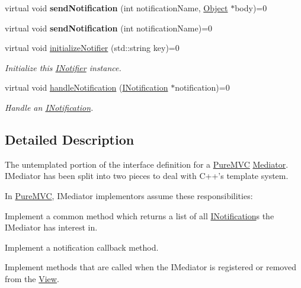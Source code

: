 \begin{DoxyCompactItemize}
\item 
\hypertarget{class_pure_m_v_c_1_1_i_notifier_a4d6bac0719be96948e4f7417489daeaa}{
virtual void {\bfseries sendNotification} (int notificationName, \hyperlink{class_pure_m_v_c_1_1_object}{Object} $\ast$body)=0}
\label{class_pure_m_v_c_1_1_i_notifier_a4d6bac0719be96948e4f7417489daeaa}

\item 
\hypertarget{class_pure_m_v_c_1_1_i_notifier_aca921608a2ced017a8face049fc7c6af}{
virtual void {\bfseries sendNotification} (int notificationName)=0}
\label{class_pure_m_v_c_1_1_i_notifier_aca921608a2ced017a8face049fc7c6af}

\item 
virtual void \hyperlink{class_pure_m_v_c_1_1_i_notifier_a28d7dbbe0726d4d52080546c5d79b232}{initializeNotifier} (std::string key)=0
\begin{DoxyCompactList}\small\item\em Initialize this \hyperlink{class_pure_m_v_c_1_1_i_notifier}{INotifier} instance. \item\end{DoxyCompactList}\item 
virtual void \hyperlink{class_pure_m_v_c_1_1_i_notification_handler_af31efbe0929caff0ac371bf45d3e9c50}{handleNotification} (\hyperlink{class_pure_m_v_c_1_1_i_notification}{INotification} $\ast$notification)=0
\begin{DoxyCompactList}\small\item\em Handle an {\ttfamily \hyperlink{class_pure_m_v_c_1_1_i_notification}{INotification}}. \item\end{DoxyCompactList}\end{DoxyCompactItemize}


\subsection{Detailed Description}
The untemplated portion of the interface definition for a \hyperlink{namespace_pure_m_v_c}{PureMVC} \hyperlink{class_pure_m_v_c_1_1_mediator}{Mediator}. IMediator has been split into two pieces to deal with C++'s template system. 

In \hyperlink{namespace_pure_m_v_c}{PureMVC}, {\ttfamily IMediator} implementors assume these responsibilities: 
\begin{DoxyItemize}
\item Implement a common method which returns a list of all {\ttfamily \hyperlink{class_pure_m_v_c_1_1_i_notification}{INotification}}s the {\ttfamily IMediator} has interest in. 
\item Implement a notification callback method. 
\item Implement methods that are called when the IMediator is registered or removed from the \hyperlink{class_pure_m_v_c_1_1_view}{View}. 
\end{DoxyItemize}

